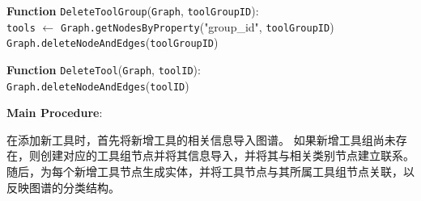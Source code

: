 \begin{algorithm}[!hpt]

    \label{alg:delete_tool_graph}
    

    \BlankLine
    \textbf{Function} \texttt{DeleteToolGroup}(\texttt{Graph}, \texttt{toolGroupID}):\\
    \Indp
        \texttt{tools} $\gets$ \texttt{Graph.getNodesByProperty}("group\_id", \texttt{toolGroupID})\;
        \texttt{Graph.deleteNodeAndEdges}(\texttt{toolGroupID})\;
    \Indm
    \BlankLine
    
    \textbf{Function} \texttt{DeleteTool}(\texttt{Graph}, \texttt{toolID}):\\
    \Indp
        \texttt{Graph.deleteNodeAndEdges}(\texttt{toolID})\;
    \Indm
    \BlankLine
    
    \textbf{Main Procedure}:\\
    \Indp
    \Indm
    \end{algorithm}

在添加新工具时，首先将新增工具的相关信息导入图谱。
如果新增工具组尚未存在，则创建对应的工具组节点并将其信息导入，并将其与相关类别节点建立联系。
随后，为每个新增工具节点生成实体，并将工具节点与其所属工具组节点关联，以反映图谱的分类结构。



